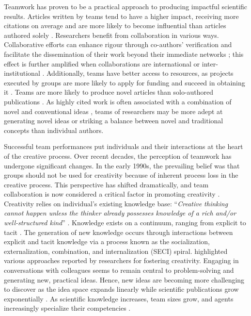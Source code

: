         Teamwork has proven to be a practical approach to producing impactful scientific results. Articles written by teams tend to have a higher impact, receiving more citations on average and are more likely to become influential than articles authored solely \citep{wuchty2007increasing,whitfield2008group}. Researchers benefit from collaboration in various ways. Collaborative efforts can enhance rigour through co-authors' verification \citep{leahey2016sole} and facilitate the dissemination of their work beyond their immediate networks \citep{leahey2016sole}; this effect is further amplified when collaborations are international or inter-institutional \citep{adams2013fourth,jones2008multi}. Additionally, teams have better access to resources, as projects executed by groups are more likely to apply for funding and succeed in obtaining it \citep{rawlings2011influence}. Teams are more likely to produce novel articles than solo-authored publications \citep{carayol2019, uzzi2013atypical, wagner2019international}. As highly cited work is often associated with a combination of novel and conventional ideas \citep{uzzi2013atypical}, teams of researchers may be more adept at generating novel ideas or striking a balance between novel and traditional concepts than individual authors.
    
        
        Successful team performances put individuals and their interactions at the heart of the creative process.
         Over recent decades, the perception of teamwork has undergone significant changes. In the early 1990s, the prevailing belief was that groups should not be used for creativity because of inherent process loss in the creative process. This perspective has shifted dramatically, and team collaboration is now considered a critical factor in promoting creativity \citep{paulus2003group}. Creativity relies on individual's existing knowledge base: ``\textit{Creative thinking cannot happen unless the thinker already possesses knowledge of a rich and/or well-structured kind}'' \citep{boden2001creativity}. Knowledge exists on a continuum, ranging from explicit to tacit \citep{nonaka1994dynamic}. The generation of new knowledge occurs through interactions between explicit and tacit knowledge via a process known as the socialization, externalization, combination, and internalization (SECI) spiral. \cite{tahamtan2018creativity} highlighted various approaches reported by researchers for fostering creativity. Engaging in conversations with colleagues seems to remain central to problem-solving and generating new, practical ideas. Hence, new ideas are becoming more challenging to discover as the idea space expands linearly while scientific publications grow exponentially \citep{bloom2020ideas,milojevic2015quantifying}. As scientific knowledge increases, team sizes grow, and agents increasingly specialize their competencies \citep{jones2008multi,jones2009burden}. 
         
